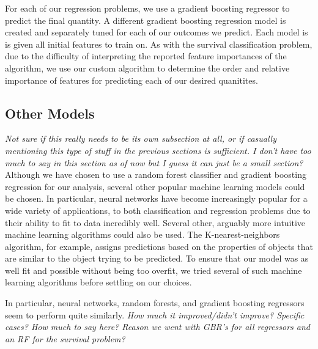 \documentclass[fleqn,usenatbib]{mnras}
\begin{document}
 For each of our regression problems, we use a gradient boosting regressor to predict the final quantity. A different gradient boosting regression model is created and separately tuned for each of our outcomes we predict. Each model is is given all initial features to train on. As with the survival classification problem, due to the difficulty of interpreting the reported feature importances of the algorithm, we use our custom algorithm to determine the order and relative importance of features for predicting each of our desired quanitites.

\subsection{Other Models}
\label{sec:other models} %
\textit{Not sure if this really needs to be its own subsection at all, or if casually mentioning this type of stuff in the previous sections is sufficient. I don't have too much to say in this section as of now but I guess it can just be a small section?}
Although we have chosen to use a random forest classifier and gradient boosting regression for our analysis, several other popular machine learning models could be chosen. In particular, neural networks have become increasingly popular for a wide variety of applications, to both classification and regression problems due to their ability to fit to data incredibly well. Several other, arguably more intuitive machine learning algorithms could also be used. The K-nearest-neighbors algorithm, for example, assigns predictions based on the properties of objects that are similar to the object trying to be predicted. To ensure that our model was as well fit and possible without being too overfit, we tried several of such machine learning algorithms before settling on our choices.

In particular, neural networks, random forests, and gradient boosting regressors seem to perform quite similarly. \textit{How much it improved/didn't improve? Specific cases? How much to say here? Reason we went with GBR's for all regressors and an RF for the survival problem?}
\end{document}
